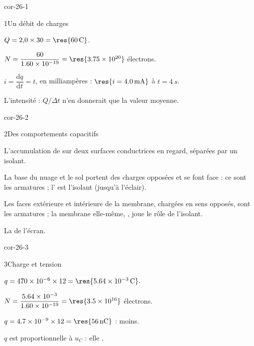 \corrigesSouples

\begin{blocLivre}{cor-26-1}
\begin{corrige}{1}{Un débit de charges}
\begin{questions}
\item $Q=2{,}0\times30=\res{\qty{60}{C}}$.
\item $N=\dfrac{60}{\num{1.60e-19}}=\res{\num{3.75e20}}$ électrons.
\item $i=\dfrac{\mathrm{d}q}{\mathrm{d}t}=t$, en milliampères : $\res{i=\qty{4,0}{mA}}$ à $t=\qty{4}{s}$.
\item L'intensité  : $Q/\Delta t$ n'en donnerait que la valeur moyenne.
\end{questions}
\end{corrige}
\end{blocLivre}
\begin{blocLivre}{cor-26-2}
\begin{corrige}{2}{Des comportements capacitifs}
\begin{questions}
\item L'accumulation de  sur deux surfaces conductrices en regard, séparées par un isolant.
\item La base du nuage et le sol portent des charges opposées et se font face : ce sont les armatures ; l' est
l'isolant (jusqu'à l'éclair).
\item Les faces extérieure et intérieure de la membrane, chargées en sens opposés, sont les armatures ; la membrane
elle-même, , joue le rôle de l'isolant.
\item La  de l'écran.
\end{questions}
\end{corrige}
\end{blocLivre}
\begin{blocLivre}{cor-26-3}
\begin{corrige}{3}{Charge et tension}
\begin{questions}
\item $q=\num{470e-6}\times12=\res{\qty{5,64e-3}{C}}$.
\item $N=\dfrac{\num{5.64e-3}}{\num{1.60e-19}}=\res{\num{3.5e16}}$ électrons.
\item $q=\num{4.7e-9}\times12=\res{\qty{56}{nC}}$ :  moins.
\item $q$ est proportionnelle à $u_C$ : elle .
\end{questions}
\end{corrige}
\end{blocLivre}
